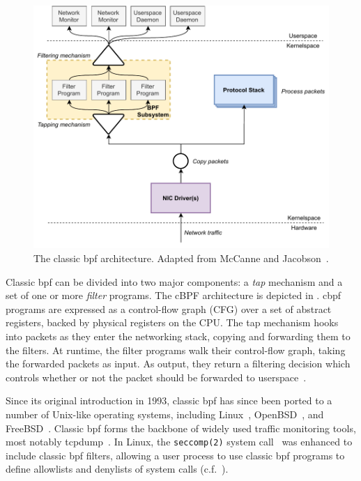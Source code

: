 \begin{figure}[tbp]
  \centering
  \includegraphics[width=0.8\linewidth]{figs/background/classic-bpf.pdf}
  \caption[The classic BPF architecture]{The classic \gls{bpf} architecture. Adapted from McCanne and Jacobson~\cite{mccanne1993_bpf}.}%
  \label{fig:classic-bpf}
\end{figure}

Classic \gls{bpf} can be divided into two major components: a \textit{tap} mechanism and a set
of one or more \textit{filter} programs. The cBPF architecture is depicted in
. \gls{cbpf} programs are expressed as a control-flow graph (CFG)
over a set of abstract registers, backed by physical registers on the CPU. The tap
mechanism hooks into packets as they enter the networking stack, copying and forwarding
them to the filters. At runtime, the filter programs walk their control-flow graph, taking
the forwarded packets as input. As output, they return a filtering decision which controls
whether or not the packet should be forwarded to userspace~\cite{mccanne1993_bpf}.

Since its original introduction in 1993, classic \gls{bpf} has since been ported to
a number of Unix-like operating systems, including Linux~\cite{linux_bpf},
OpenBSD~\cite{openbsd_bpf}, and FreeBSD~\cite{freebsd_bpf}. Classic \gls{bpf} forms the
backbone of widely used traffic monitoring tools, most notably tcpdump~\cite{tcpdump,
mccanne1993_bpf}. In Linux, the \texttt{seccomp(2)} system
call~\cite{anderson2017_comparison} was enhanced to include classic \gls{bpf} filters,
allowing a user process to use classic \gls{bpf} programs to define allowlists and
denylists of system calls (c.f.~).


